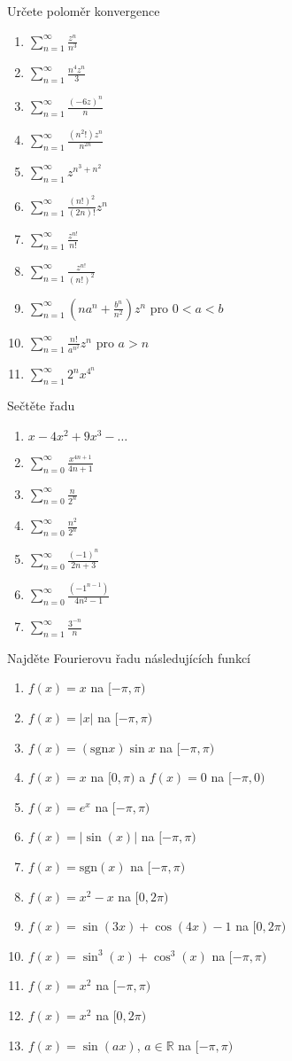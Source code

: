 \begin{multicols}{2}
Určete poloměr konvergence
\begin{enumerate}
\item $\sum_{n=1}^\infty \frac{z^n}{n^3}$
\item $\sum_{n=1}^\infty \frac{n^4 z^n}{3}$
\item $\sum_{n=1}^\infty \frac{(-6z)^n}{n}$
\item $\sum_{n=1}^\infty \frac{(n^2!)z^n}{n^{2n}}$
\item $\sum_{n=1}^\infty z^{n^3 + n^2}$
\item $\sum_{n=1}^\infty \frac{(n!)^2}{(2n)!} z^n$
\item $\sum_{n=1}^\infty \frac{z^{n!}}{n!}$
\item $\sum_{n=1}^\infty \frac{z^{n!}}{(n!)^2}$
\item $\sum_{n=1}^\infty \left( na^n + \frac{b^n}{n^2} \right) z^n$ pro $0 < a < b$
\item $\sum_{n=1}^\infty \frac{n!}{a^{n^2}} z^n$ pro $a > n$
\item $\sum_{n=1}^\infty 2^n x^{4^n}$
\end{enumerate}

\separator

Sečtěte řadu
\begin{enumerate}
\item $x - 4x^2 + 9x^3 - \ldots$
\item $\sum_{n=0}^\infty \frac{x^{4n+1}}{4n+1}$
\item $\sum_{n=0}^\infty \frac{n}{2^n}$
\item $\sum_{n=0}^\infty \frac{n^2}{2^n}$
\item $\sum_{n=0}^\infty \frac{(-1)^n}{2n+3}$
\item $\sum_{n=0}^\infty \frac{(-1^{n-1})}{4n^2 - 1}$
\item $\sum_{n=1}^{\infty} \frac{3^{-n}}{n}$
\end{enumerate}

\separator

Najděte Fourierovu řadu následujících funkcí
\begin{enumerate}
\item $f(x) = x$ na $[-\pi,\pi)$
\item $f(x) = | x |$ na $[-\pi,\pi)$
\item $f(x) = (\textrm{sgn} x) \sin x$ na $[-\pi, \pi)$
\item $f(x) = x$ na $[0,\pi)$ a $f(x)=0$ na $[-\pi,0)$
\item $f(x) = e^x$ na $[-\pi, \pi)$
\item $f(x) = |\sin(x)|$ na $[-\pi, \pi)$
\item $f(x) = \textrm{sgn} (x)$ na $[-\pi, \pi)$
\item $f(x) = x^2 - x$ na $[0, 2 \pi)$
\item $f(x) = \sin (3x) + \cos (4x) - 1$ na $[0, 2 \pi)$
\item $f(x) = \sin^3 (x) + \cos^3 (x)$ na $[-\pi, \pi)$
\item $f(x) = x^2$ na $[-\pi, \pi)$
\item $f(x) = x^2$ na $[0, 2 \pi)$
\item $f(x) = \sin (ax)$, $a \in \mathbb{R}$ na $[-\pi, \pi)$
\end{enumerate}


\end{multicols}
